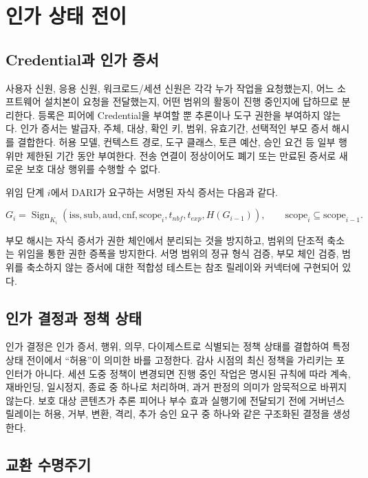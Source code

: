 \documentclass[10pt]{article}
\begin{document}
\section{인가 상태 전이}

\subsection{Credential과 인가 증서}

사용자 신원, 응용 신원, 워크로드/세션 신원은 각각 누가 작업을 요청했는지, 어느 소프트웨어 설치본이 요청을 전달했는지, 어떤 범위의 활동이 진행 중인지에 답하므로 분리한다. 등록은 피어에 Credential을 부여할 뿐 추론이나 도구 권한을 부여하지 않는다. 인가 증서는 발급자, 주체, 대상, 확인 키, 범위, 유효기간, 선택적인 부모 증서 해시를 결합한다. 허용 모델, 컨텍스트 경로, 도구 클래스, 토큰 예산, 승인 요건 등 일부 행위만 제한된 기간 동안 부여한다. 전송 연결이 정상이어도 폐기 또는 만료된 증서로 새로운 보호 대상 행위를 수행할 수 없다.

위임 단계 $i$에서 DARI가 요구하는 서명된 자식 증서는 다음과 같다.

\begin{equation}
G_i = \operatorname{Sign}_{K_i}(\mathrm{iss},\mathrm{sub},\mathrm{aud},\mathrm{cnf},\mathrm{scope}_i,t_{nbf},t_{exp},H(G_{i-1})),
\qquad \mathrm{scope}_i \subseteq \mathrm{scope}_{i-1}.
\label{eq:attenuation}
\end{equation}

부모 해시는 자식 증서가 권한 체인에서 분리되는 것을 방지하고, 범위의 단조적 축소는 위임을 통한 권한 증폭을 방지한다. 서명 범위의 정규 형식 검증, 부모 체인 검증, 범위를 축소하지 않는 증서에 대한 적합성 테스트는 참조 릴레이와 커넥터에 구현되어 있다.

\subsection{인가 결정과 정책 상태}

인가 결정은 인가 증서, 행위, 의무, 다이제스트로 식별되는 정책 상태를 결합하여 특정 상태 전이에서 ``허용''이 의미한 바를 고정한다. 감사 시점의 최신 정책을 가리키는 포인터가 아니다. 세션 도중 정책이 변경되면 진행 중인 작업은 명시된 규칙에 따라 계속, 재바인딩, 일시정지, 종료 중 하나로 처리하며, 과거 판정의 의미가 암묵적으로 바뀌지 않는다. 보호 대상 콘텐츠가 추론 피어나 부수 효과 실행기에 전달되기 전에 거버넌스 릴레이는 허용, 거부, 변환, 격리, 추가 승인 요구 중 하나와 같은 구조화된 결정을 생성한다.

\subsection{교환 수명주기}
\end{document}
